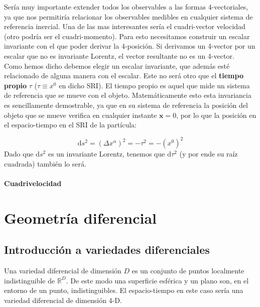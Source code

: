 \documentclass[12pt,a4paper]{book}
\numberwithin{equation}{section}
\numberwithin{figure}{section}
\newcommand{\D}{\mathrm{d}}
\newcommand{\xn}{\mathbf{x}}
\begin{document}
Sería muy importante extender todos los observables a las formas 4-vectoriales, ya que nos permitiría relacionar los observables medibles en cualquier sistema de referencia inercial. Una de las mas interesantes sería el cuadri-vector velocidad (otro podría ser el cuadri-momento). Para esto necesitamos construir un escalar invariante con el que poder derivar la 4-posición. Si derivamos un 4-vector por un escalar que no es invariante Lorentz, el vector resultante no es un 4-vector. \\

Como hemos dicho debemos elegir un escalar invariante, que además esté relacionado de alguna manera con el escalar. Este no será otro que el \textbf{tiempo propio} $\tau $ ($\tau \equiv x^0$ en dicho SRI). El tiempo propio es aquel que mide un sistema de referencia que se mueve con el objeto. Matemáticamente esto esta invariancia es sencillamente demostrable, ya que en su sistema de referencia la posición del objeto que se mueve verifica en cualquier instante $\xn=0$, por lo que la posición en el espacio-tiempo en el SRI de la partícula:

\begin{equation}
\D s^2 = (\Delta x^{\alpha})^2 = - \tau^2= - (x^{0})^2
\end{equation}
Dado que $\D s^2$ es un invariante Lorentz, tenemos que $\D \tau^2$ (y por ende su raíz cuadrada) también lo será.

\subsubsection{Cuadrivelocidad}

\newpage

\chapter{Geometría diferencial}

\section{Introducción a variedades diferenciales}

Una variedad diferencial de dimensión $D$ es un conjunto de puntos localmente indistinguible de $\mathbb{R}^D$. De este modo una superficie esférica y un plano son, en el entorno de un punto, indistinguibles. El espacio-tiempo en este caso sería una variedad diferencial de dimensión 4-D. \\
\end{document}
